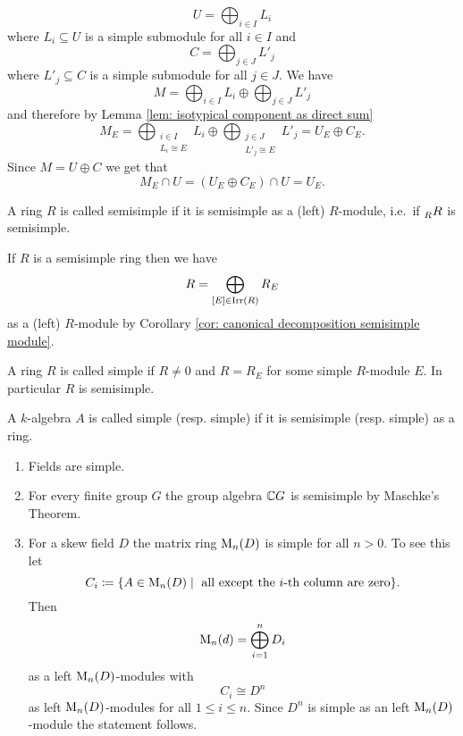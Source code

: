 \begin{rem}
\begin{enumerate}[label=\emph{\alph*)},leftmargin=*]
   \[
    U = \bigoplus_{i \in I} L_i
   \]
   where $L_i \subseteq U$ is a simple submodule for all $i \in I$ and
   \[
    C = \bigoplus_{j \in J} L'_j
   \]
   where $L'_j \subseteq C$ is a simple submodule for all $j \in J$. We have
   \[
    M = \bigoplus_{i \in I} L_i \oplus \bigoplus_{j \in J} L'_j
   \]
   and therefore by Lemma \ref{lem: isotypical component as direct sum}
   \[
    M_E
    = \bigoplus_{\substack{i \in I \\ L_i \cong E}} L_i \oplus \bigoplus_{\substack{j \in J \\ L'_j \cong E}} L'_j
    = U_E \oplus C_E.
   \]
   Since $M = U \oplus C$ we get that
   \[
    M_E \cap U = (U_E \oplus C_E) \cap U = U_E.
   \]
 \end{enumerate}
\end{rem}


\begin{defi}
 A ring $R$ is called semisimple if it is semisimple as a (left) $R$-module, i.e.\ if $\prescript{}{R}{R}$ is semisimple.
\end{defi}


If $R$ is a semisimple ring then we have
\[
 R = \bigoplus_{[E] \in \operatorname{Irr}(R)} R_E
\]
as a (left) $R$-module by Corollary \ref{cor: canonical decomposition semisimple module}.


\begin{defi}
 A ring $R$ is called simple if $R \neq 0$ and $R = R_E$ for some simple $R$-module $E$. In particular $R$ is semisimple.
\end{defi}


\begin{defi}
 A $k$-algebra $A$ is called simple (resp. simple) if it is semisimple (resp. simple) as a ring.
\end{defi}


\begin{expls}
 \begin{enumerate}[label=\emph{\alph*)},leftmargin=*]
  \item
   Fields are simple.
  \item
   For every finite group $G$ the group algebra $\mathbb{C} G$ is semisimple by Maschke’s Theorem.
  \item
   For a skew field $D$ the matrix ring $\operatorname{M}_n(D)$ is simple for all $n > 0$. To see this let
   \[
    C_i
    \coloneqq \{ A \in \operatorname{M}_n(D) \mid \text{ all except the $i$-th column are zero} \}.
   \]
   Then
   \[
    \operatorname{M}_n(d) = \bigoplus_{i=1}^n D_i
   \]
   as a left $\operatorname{M}_n(D)$-modules with
   \[
    C_i \cong D^n
   \]
   as left $\operatorname{M}_n(D)$-modules for all $1 \leq i \leq n$. Since $D^n$ is simple as an left $\operatorname{M}_n(D)$-module the statement follows.
 \end{enumerate}
\end{expls}


